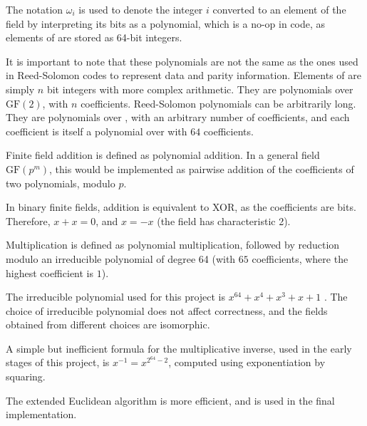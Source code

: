 The notation $\omega_i$ is used to denote the integer $i$ converted to an element of the field  by interpreting its bits as a polynomial, which is a no-op in code, as elements of  are stored as 64-bit integers.

It is important to note that these polynomials are not the same as the ones used in Reed-Solomon codes to represent data and parity information.
Elements of  are simply $n$ bit integers with more complex arithmetic. They are polynomials over $\text{GF}(2)$, with $n$ coefficients.
Reed-Solomon polynomials can be arbitrarily long. They are polynomials over , with an arbitrary number of coefficients, and each coefficient is itself a polynomial over  with $64$ coefficients.

Finite field addition is defined as polynomial addition.
In a general field $\text{GF}(p^m)$, this would be implemented as pairwise addition of the coefficients of two polynomials, modulo $p$.

In binary finite fields, addition is equivalent to XOR, as the coefficients are bits. Therefore, $x + x = 0$, and $x = -x$ (the field has characteristic 2).

Multiplication is defined as polynomial multiplication, followed by reduction modulo an irreducible polynomial of degree 64 (with $65$ coefficients, where the highest coefficient is $1$).

The irreducible polynomial used for this project is $x^{64} + x^4 + x^3 + x + 1$ \cite{low-weight-polynomials}.
The choice of irreducible polynomial does not affect correctness, and the fields obtained from different choices are isomorphic.


A simple but inefficient formula for the multiplicative inverse, used in the early stages of this project, is $x^{-1} = x^{2^{64} - 2}$, computed using exponentiation by squaring.

The extended Euclidean algorithm is more efficient, and is used in the final implementation.
